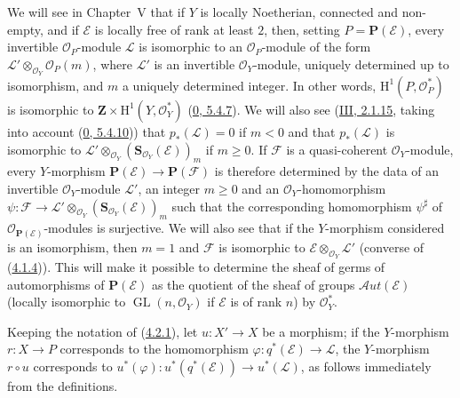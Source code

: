 \begin{remark}[4.2.7]
\label{II.4.2.7}
We will see in Chapter~V that if $Y$ is locally Noetherian, connected and non-empty,
and if $\mathcal{E}$ is locally free of rank at least $2$, then, setting
$P=\mathbf{P}(\mathcal{E})$, every invertible $\mathcal{O}_P$-module
$\mathcal{L}$ is isomorphic to an $\mathcal{O}_P$-module of the form
$\mathcal{L}'\otimes_{\mathcal{O}_Y}\mathcal{O}_P(m)$, where $\mathcal{L}'$ is
an invertible $\mathcal{O}_Y$-module, uniquely determined up to isomorphism,
and $m$ a uniquely determined integer. In other words,
$\mathrm{H}^1(P,\mathcal{O}_P^*)$ is isomorphic to
$\mathbf{Z}\times\mathrm{H}^1(Y,\mathcal{O}_Y^*)$
(\hyperref[0.5.4.7]{0, 5.4.7}). We will also see
(\hyperref[III.2.1.15]{III, 2.1.15}, taking into account
(\hyperref[0.5.4.10]{0, 5.4.10})) that
$p_*(\mathcal{L})=0$ if $m<0$ and that
$p_*(\mathcal{L})$ is isomorphic to
$\mathcal{L}'\otimes_{\mathcal{O}_Y}
(\mathbf{S}_{\mathcal{O}_Y}(\mathcal{E}))_m$ if $m\geq0$. If $\mathcal{F}$
is a quasi-coherent $\mathcal{O}_Y$-module, every $Y$-morphism
$\mathbf{P}(\mathcal{E})\to\mathbf{P}(\mathcal{F})$ is therefore determined by
the data of an invertible $\mathcal{O}_Y$-module $\mathcal{L}'$, an integer
$m\geq0$ and an $\mathcal{O}_Y$-homomorphism
$\psi:\mathcal{F}\to\mathcal{L}'\otimes_{\mathcal{O}_Y}
(\mathbf{S}_{\mathcal{O}_Y}(\mathcal{E}))_m$ such that the
corresponding homomorphism $\psi^\sharp$ of $\mathcal{O}_{\mathbf{P}(\mathcal{E})}$-modules
is surjective. We will also see that if the $Y$-morphism considered is an
isomorphism, then $m=1$ and $\mathcal{F}$ is isomorphic to
$\mathcal{E}\otimes_{\mathcal{O}_Y}\mathcal{L}'$ (converse of
(\hyperref[II.4.1.4]{4.1.4})). This will make it possible to determine the
sheaf of germs of automorphisms of $\mathbf{P}(\mathcal{E})$ as the quotient
of the sheaf of groups $\mathcal{A}ut(\mathcal{E})$ (locally isomorphic to
$\operatorname{GL}(n,\mathcal{O}_Y)$ if $\mathcal{E}$ is of rank $n$) by
$\mathcal{O}_Y^*$.
\end{remark}

\begin{env}[4.2.8]
\label{II.4.2.8}
Keeping the notation of (\hyperref[II.4.2.1]{4.2.1}), let
$u:X'\to X$ be a morphism; if the $Y$-morphism $r:X\to P$ corresponds to
the homomorphism $\varphi:q^*(\mathcal{E})\to\mathcal{L}$, the $Y$-morphism
$r\circ u$ corresponds to
$u^*(\varphi):u^*(q^*(\mathcal{E}))\to u^*(\mathcal{L})$, as follows
immediately from the definitions.
\end{env}

